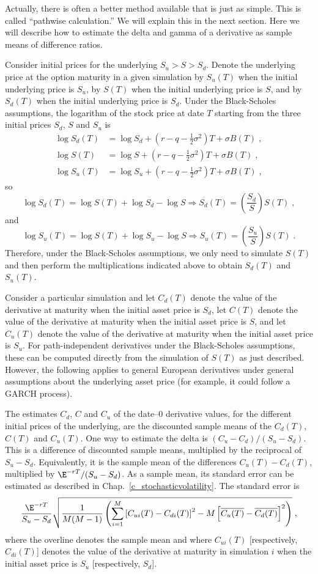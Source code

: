 Actually, there is often a better method available that is just as simple.  This is called ``pathwise calculation.''  We will explain this in the next section.   Here we will describe how to estimate the delta and gamma of a derivative as sample means of difference ratios.

Consider  initial prices for the underlying $S_u>S>S_d$.  Denote the underlying price at the option maturity in a given simulation by $S_u(T)$  when the initial underlying price is $S_u$, by $S(T)$  when the initial underlying price is $S$, and by $S_d(T)$  when the initial underlying price is $S_d$.   Under the Black-Scholes assumptions, the logarithm of the stock price at date $T$ starting from the three initial prices $S_d$, $S$ and $S_u$ is
\begin{align*}
\log S_d(T) &= \log S_d + \left(r-q-\frac{1}{2}\sigma^2\right)T + \sigma B(T)\; ,\\
\log S(T) &= \log S + \left(r-q-\frac{1}{2}\sigma^2\right)T + \sigma B(T)\; ,\\
\log S_u (T) &= \log S_u + \left(r-q-\frac{1}{2}\sigma^2\right)T + \sigma B(T)\;,
\end{align*}
so 
$$\log S_d(T) = \log S(T) + \log S_d - \log S\Longrightarrow S_d(T) = \left(\frac{S_d}{S}\right) S(T)\; ,$$
and
$$\log S_u(T) = \log S(T) + \log S_u - \log S \Longrightarrow S_u(T) = \left(\frac{S_u}{S}\right) S(T)\; .$$
Therefore, under the Black-Scholes assumptions, we only need to simulate $S(T)$ and then perform the multiplications indicated above to obtain $S_d(T)$ and $S_u(T)$. 

Consider a particular simulation and let $C_d(T)$ denote the value of the derivative at maturity  when the initial asset price is $S_d$, let  $C(T)$ denote the value of the derivative at maturity  when the initial asset price is $S$, and let $C_u(T)$ denote the value of the derivative at maturity  when the initial asset price is $S_u$.  For path-independent derivatives under the Black-Scholes assumptions, these can be computed directly from the simulation of $S(T)$ as just described.  However, the following applies to general European derivatives under general assumptions about the underlying asset price (for example, it could follow a GARCH process).

The estimates $C_d$, $C$ and $C_u$ of the date--0 derivative values, for the different initial prices of the underlying, are the discounted sample means of the $C_d(T)$, $C(T)$ and $C_u(T)$.
One way to estimate the delta is $(C_u-C_d)/(S_u-S_d)$.  This is a difference of discounted sample means, multiplied by the reciprocal of $S_u-S_d$.  Equivalently, it is the sample mean of the differences $C_u(T)-C_d(T)$, multiplied by $\E^{-rT}/(S_u-S_d)$.  As a sample mean, its standard error can be estimated as described in Chap.~\ref{c_stochasticvolatility}.   The standard error is
$$\frac{\E^{-rT}}{S_u-S_d}\sqrt{\frac{1}{M(M-1)}\left(\sum_{i=1}^M \left[C_{ui}(T)-C_{di}(T)\right]^2 - M\left[\overline{C_{u}(T)}-\overline{C_{d}(T)}\right]^2\right)}\; ,$$ 
where the overline denotes the sample mean and where $C_{ui}(T)$ [respectively, $C_{di}(T)$] denotes the value of the derivative at maturity in simulation $i$ when the initial asset price is $S_u$ [respectively, $S_d$].

